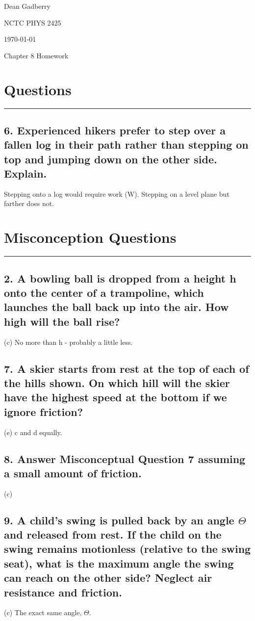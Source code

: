 \documentclass[12pt,a4paper,english]{article}
\begin{document}
\begin{flushright}
  Dean Gadberry

  NCTC PHYS 2425

  \today
\end{flushright}
\begin{center}
  {\large Chapter 8 Homework}
\end{center}
\begin{flushleft}

  \section*{Questions}
  \hrule
  \subsection{6. Experienced hikers prefer to step over a fallen log in their path rather than stepping on top and jumping down on the other side. Explain.}
  Stepping onto a log would require work (W). Stepping on a level plane but farther does not.
  \section*{Misconception Questions}
  \hrule
  \subsection{2. A bowling ball is dropped from a height h onto the center of a trampoline, which launches the ball back up into the air. How high will the ball rise?}
  (c) No more than h - probably a little less.
  \subsection{7. A skier starts from rest at the top of each of the hills shown. On which hill will the skier have the highest speed at the bottom if we ignore friction?}
  (e) c and d equally.
  \subsection{8. Answer Misconceptual Question 7 assuming a small amount of friction.}
  (c)
  \subsection{9. A child's swing is pulled back by an angle $\Theta$ and released from rest. If the child on the swing remains motionless (relative to the swing seat), what is the maximum angle the swing can reach on the other side? Neglect air resistance and friction.}
  (c) The exact same angle, $\Theta$.

\end{flushleft}
\end{document}
